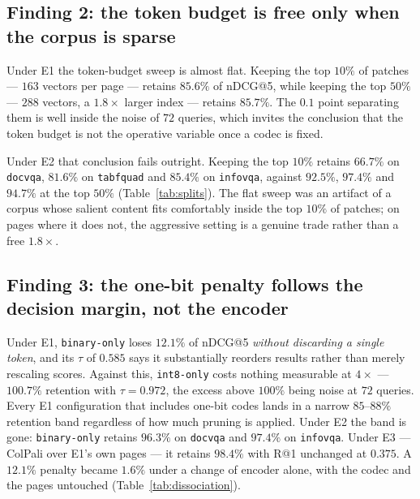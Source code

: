 \documentclass[conference]{IEEEtran}
\begin{document}
\subsection{Finding 2: the token budget is free only when the corpus is sparse}
\label{sec:sweep}
Under E1 the token-budget sweep is almost flat. Keeping the
top $10\%$ of patches --- $163$ vectors per page --- retains $85.6\%$ of nDCG@5,
while keeping the top $50\%$ --- $288$ vectors, a $1.8\times$ larger index ---
retains $85.7\%$. The $0.1$ point separating them is well inside the noise of $72$
queries, which invites the conclusion that the token budget is not the operative
variable once a codec is fixed.

Under E2 that conclusion fails outright. Keeping the top $10\%$ retains $66.7\%$
on \texttt{docvqa}, $81.6\%$ on \texttt{tabfquad} and $85.4\%$ on
\texttt{infovqa}, against $92.5\%$, $97.4\%$ and $94.7\%$ at the top $50\%$
(Table~\ref{tab:splits}). The flat sweep was an artifact of a corpus whose salient
content fits comfortably inside the top $10\%$ of patches; on pages where it does
not, the aggressive setting is a genuine trade rather than a free $1.8\times$.

\subsection{Finding 3: the one-bit penalty follows the decision margin, not the encoder}
\label{sec:finding3}
Under E1, \texttt{binary-only} loses $12.1\%$ of nDCG@5 \emph{without discarding a
single token}, and its $\tau$ of $0.585$ says it substantially reorders results
rather than merely rescaling scores. Against this, \texttt{int8-only} costs
nothing measurable at $4\times$ --- $100.7\%$ retention with $\tau = 0.972$, the
excess above $100\%$ being noise at $72$ queries. Every E1 configuration that includes
one-bit codes lands in a narrow $85$--$88\%$ retention band regardless of how much
pruning is applied. Under E2 the band is gone: \texttt{binary-only} retains
$96.3\%$ on \texttt{docvqa} and $97.4\%$ on \texttt{infovqa}. Under E3 --- ColPali
over E1's own pages --- it retains $98.4\%$ with R@1 unchanged at $0.375$. A
$12.1\%$ penalty became $1.6\%$ under a change of encoder alone, with the codec
and the pages untouched (Table~\ref{tab:dissociation}).
\end{document}
